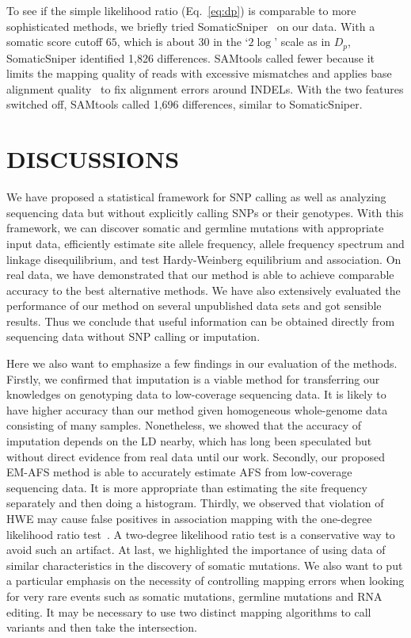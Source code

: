 \documentclass{bioinfo}
\begin{document}
To see if the simple likelihood ratio (Eq.~\ref{eq:dp}) is comparable to more
sophisticated methods, we briefly tried SomaticSniper~\citep{Larson:2011xx} on
our data.  With a somatic score cutoff $65$, which is about $30$ in the
`$2\log$' scale as in $D_p$, SomaticSniper identified 1,826 differences.
SAMtools called fewer because it limits the mapping quality of reads with
excessive mismatches and applies base alignment quality~\citep{Li:2011kx} to
fix alignment errors around INDELs.  With the two features switched off,
SAMtools called 1,696 differences, similar to SomaticSniper.

\section{DISCUSSIONS}

We have proposed a statistical framework for SNP calling as well as analyzing
sequencing data but without explicitly calling SNPs or their genotypes. With
this framework, we can discover somatic and germline mutations with appropriate
input data, efficiently estimate site allele frequency, allele
frequency spectrum and linkage disequilibrium, and test Hardy-Weinberg
equilibrium and association. On real data, we have demonstrated that our method
is able to achieve comparable accuracy to the best alternative methods.  We
have also extensively evaluated the performance of our method on several
unpublished data sets and got sensible results. Thus we conclude that useful
information can be obtained directly from sequencing data without SNP calling
or imputation.

Here we also want to emphasize a few findings in our evaluation of the methods.
Firstly, we confirmed that imputation is a viable method for transferring our
knowledges on genotyping data to low-coverage sequencing data.  It is likely to
have higher accuracy than our method given homogeneous whole-genome data
consisting of many samples. Nonetheless, we showed that the accuracy of
imputation depends on the LD nearby, which has long been speculated but without
direct evidence from real data until our work. Secondly, our proposed EM-AFS
method is able to accurately estimate AFS from low-coverage sequencing data. It
is more appropriate than estimating the site frequency separately and then
doing a histogram.  Thirdly, we observed that violation of HWE may cause false
positives in association mapping with the one-degree likelihood ratio
test~\citep{Kim:2011fk}. A two-degree likelihood ratio test is a conservative
way to avoid such an artifact. At last, we highlighted the importance of using
data of similar characteristics in the discovery of somatic mutations. We also
want to put a particular emphasis on the necessity of controlling mapping
errors when looking for very rare events such as somatic mutations, germline
mutations and RNA editing. It may be necessary to use two distinct mapping
algorithms to call variants and then take the intersection.
\end{document}
